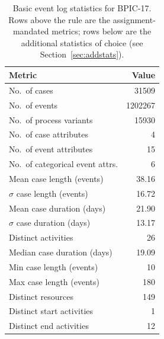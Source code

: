 \documentclass[
  english,        %
  font=times,     %
  twocolumn,      %
]{tumarticle}
\begin{document}
\begin{table}[h]
    \caption{Basic event log statistics for BPIC-17. Rows above the rule are the assignment-mandated metrics; rows below are the additional statistics of choice (see Section~\ref{sec:addstats}).}
    \centering
    \footnotesize
    \renewcommand{\arraystretch}{1.00}
    \setlength{\tabcolsep}{4pt}
    \begin{tabular}{lr}
        \toprule
        \textbf{Metric} & \textbf{Value} \\
        \midrule
        No.\ of cases                           & \num{31509}          \\
        No.\ of events                          & \num{1202267}        \\
        No.\ of process variants                & \num{15930}          \\
        No.\ of case attributes                 & \num{4}              \\
        No.\ of event attributes                & \num{15}             \\
        No.\ of categorical event attrs.        & \num{6}              \\
        Mean case length (events)               & \num{38.16}          \\
        $\sigma$ case length (events)           & \num{16.72}          \\
        Mean case duration (days)               & \num{21.90}          \\
        $\sigma$ case duration (days)           & \num{13.17}          \\
        \midrule
        Distinct activities                     & \num{26}             \\
        Median case duration (days)             & \num{19.09}          \\
        Min case length (events)                & \num{10}             \\
        Max case length (events)                & \num{180}            \\
        Distinct resources                      & \num{149}            \\
        Distinct start activities               & \num{1}              \\
        Distinct end activities                 & \num{12}             \\
        \bottomrule
    \end{tabular}
    \label{tab:statistics}
\end{table}
\end{document}
